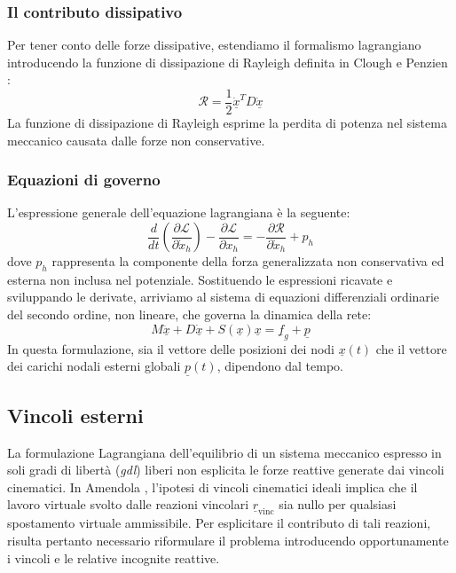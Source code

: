 \subsubsection{Il contributo dissipativo}
Per tener conto delle forze dissipative, estendiamo il formalismo lagrangiano introducendo la funzione di dissipazione di Rayleigh definita in Clough e Penzien \cite{Penzien}:
\begin{equation}
   \mathcal{R} = \frac{1}{2} \underline{\dot{x}}^T D \underline{\dot{x}}
   \label{eq:dissipazione}
\end{equation}
La funzione di dissipazione di Rayleigh esprime la perdita di potenza nel sistema meccanico causata dalle forze non conservative.

\subsubsection{Equazioni di governo}
L'espressione generale dell'equazione lagrangiana è la seguente: 
\begin{equation}
   \frac{d}{dt} \left( \frac{\partial \mathcal{L}}{\partial \dot{x}_h}\right) - \frac{\partial \mathcal{L}}{\partial  x_h} = - \frac{\partial \mathcal{R}}{\partial \dot{x}_h} + p_h
   \label{eq:equazione_lagrangiana}
\end{equation}
dove $p_h$ rappresenta la componente della forza generalizzata non conservativa ed esterna non inclusa nel potenziale.
Sostituendo le espressioni ricavate e sviluppando le derivate, arriviamo al sistema di equazioni differenziali ordinarie del secondo ordine, non lineare, che governa la dinamica della rete: 
\begin{equation}
   M \ddot{\underline{x}} + D \dot{\underline{x}} + S(\underline{x}) \underline{x} = \underline{f}_g + \underline{p}
   \label{eq:equilibrio_dinamico_problema}
\end{equation}
In questa formulazione, sia il vettore delle posizioni dei nodi $\underline{x}(t)$ che il vettore dei carichi nodali esterni globali $\underline{p}(t)$, dipendono dal tempo. 

\subsection{Vincoli esterni}
La formulazione Lagrangiana dell'equilibrio di un sistema meccanico espresso in soli gradi di libertà (\textit{gdl}) liberi non esplicita le forze reattive generate dai vincoli cinematici. In Amendola \cite{Amendola}, l'ipotesi di vincoli cinematici ideali implica che il lavoro virtuale svolto dalle reazioni vincolari $\underline{r}_{\text{vinc}}$ sia nullo per qualsiasi spostamento virtuale ammissibile. Per esplicitare il contributo di tali reazioni, risulta pertanto necessario riformulare il problema introducendo opportunamente i vincoli e le relative incognite reattive.

